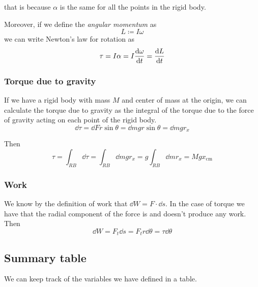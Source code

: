 \documentclass[12pt]{extarticle}
\begin{document}
that is because $\alpha$ is the same for all the points in the rigid body.

Moreover, if we define the \emph{angular momentum} as
\begin{equation}
    L \coloneq I \omega
\end{equation}
we can write Newton's law for rotation as
\begin{equation}
    \tau = I \alpha = I \dv{\omega}{t} = \dv{L}{t}
\end{equation}

\subsubsection{Torque due to gravity}

If we have a rigid body with mass $M$ and center of mass at the origin, we can calculate the torque due to gravity as the integral of the torque due to the force of gravity acting on each point of the rigid body.
\begin{equation}
    \dd{\tau} = \dd{F} r \sin \theta = \dd{m} g r \sin \theta = \dd{m} g r_x
\end{equation}

Then
\begin{equation}
    \tau = \int_{RB} \dd{\tau} = \int_{RB} \dd{m} g r_x = g \int_{RB} \dd{m} r_x = M g x_{\text{cm}}
\end{equation}

\subsubsection{Work}

We know by the definition of work that $\dd{W} = F \cdot \dd{s}$. In the case of torque we have that the radial component of the force is  and doesn't produce any work. Then
\begin{equation}
    \dd{W} = F_t \dd{s} = F_t r \dd{\theta} = \tau \dd{\theta}
\end{equation}

\subsection{Summary table}

We can keep track of the variables we have defined in a table.
\end{document}
